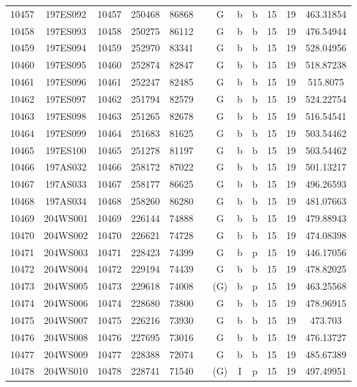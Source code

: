 \begin{tabular}{|*{12}{c|}}
10457 & 197ES092 & 10457 & 250468 & 86868 &  & G & b & b & 15 & 19 & 463.31854 \\ 
10458 & 197ES093 & 10458 & 250275 & 86112 &  & G & b & b & 15 & 19 & 476.54944 \\ 
10459 & 197ES094 & 10459 & 252970 & 83341 &  & G & b & b & 15 & 19 & 528.04956 \\ 
10460 & 197ES095 & 10460 & 252874 & 82847 &  & G & b & b & 15 & 19 & 518.87238 \\ 
10461 & 197ES096 & 10461 & 252247 & 82485 &  & G & b & b & 15 & 19 & 515.8075 \\ 
10462 & 197ES097 & 10462 & 251794 & 82579 &  & G & b & b & 15 & 19 & 524.22754 \\ 
10463 & 197ES098 & 10463 & 251265 & 82678 &  & G & b & b & 15 & 19 & 516.54541 \\ 
10464 & 197ES099 & 10464 & 251683 & 81625 &  & G & b & b & 15 & 19 & 503.54462 \\ 
10465 & 197ES100 & 10465 & 251278 & 81197 &  & G & b & b & 15 & 19 & 503.54462 \\ 
10466 & 197AS032 & 10466 & 258172 & 87022 &  & G & b & b & 15 & 19 & 501.13217 \\ 
10467 & 197AS033 & 10467 & 258177 & 86625 &  & G & b & b & 15 & 19 & 496.26593 \\ 
10468 & 197AS034 & 10468 & 258260 & 86280 &  & G & b & b & 15 & 19 & 481.07663 \\ 
10469 & 204WS001 & 10469 & 226144 & 74888 &  & G & b & b & 15 & 19 & 479.88943 \\ 
10470 & 204WS002 & 10470 & 226621 & 74728 &  & G & b & b & 15 & 19 & 474.08398 \\ 
10471 & 204WS003 & 10471 & 228423 & 74399 &  & G & b & p & 15 & 19 & 446.17056 \\ 
10472 & 204WS004 & 10472 & 229194 & 74439 &  & G & b & b & 15 & 19 & 478.82025 \\ 
10473 & 204WS005 & 10473 & 229618 & 74008 &  & (G) & b & p & 15 & 19 & 463.25568 \\ 
10474 & 204WS006 & 10474 & 228680 & 73800 &  & G & b & b & 15 & 19 & 478.96915 \\ 
10475 & 204WS007 & 10475 & 226216 & 73930 &  & G & b & b & 15 & 19 & 473.703 \\ 
10476 & 204WS008 & 10476 & 227695 & 73016 &  & G & b & b & 15 & 19 & 476.13727 \\ 
10477 & 204WS009 & 10477 & 228388 & 72074 &  & G & b & b & 15 & 19 & 485.67389 \\ 
10478 & 204WS010 & 10478 & 228741 & 71540 &  & (G) & I & p & 15 & 19 & 497.49951 \\ 

\end{tabular}
